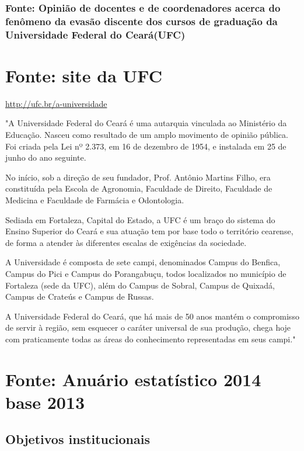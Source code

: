 \documentclass{report}
\begin{document}
\subsubsection{Fonte: Opinião de docentes e de coordenadores acerca do fenômeno da evasão discente dos cursos de graduação da Universidade Federal do Ceará(UFC)}


\section{Fonte: site da UFC}

\url{http://ufc.br/a-universidade}

"A Universidade Federal do Ceará é uma autarquia vinculada ao Ministério da Educação. Nasceu como resultado de um amplo movimento de opinião pública. Foi criada pela Lei nº 2.373, em 16 de dezembro de 1954, e instalada em 25 de junho do ano seguinte.

No início, sob a direção de seu fundador, Prof. Antônio Martins Filho, era constituída pela Escola de Agronomia, Faculdade de Direito, Faculdade de Medicina e Faculdade de Farmácia e Odontologia.

Sediada em Fortaleza, Capital do Estado, a UFC é um braço do sistema do Ensino Superior do Ceará e sua atuação tem por base todo o território cearense, de forma a atender às diferentes escalas de exigências da sociedade.

A Universidade é composta de sete campi, denominados Campus do Benfica, Campus do Pici e Campus do Porangabuçu, todos localizados no município de Fortaleza (sede da UFC), além do Campus de Sobral, Campus de Quixadá, Campus de Crateús e Campus de Russas.

A Universidade Federal do Ceará, que há mais de 50 anos mantém o compromisso de servir à região, sem esquecer o caráter universal de sua produção, chega hoje com praticamente todas as áreas do conhecimento representadas em seus campi." 

\section{Fonte: Anuário estatístico 2014 base 2013}

\cite{anuario_2014_base_2013}

\subsection{Objetivos institucionais}
\end{document}
